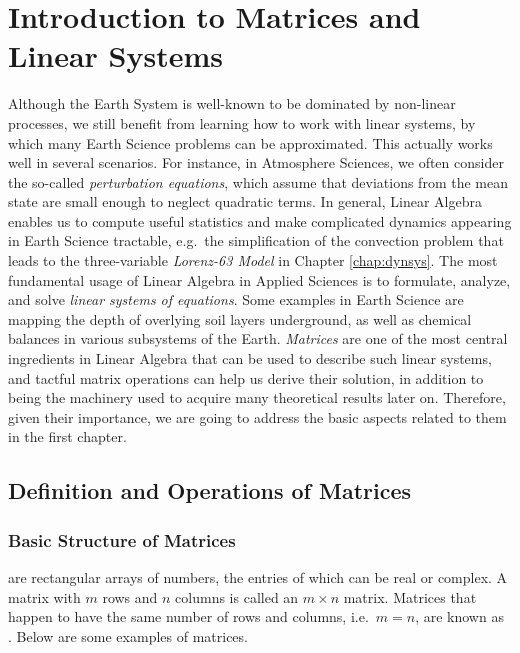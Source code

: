 \chapter{Introduction to Matrices and Linear Systems}

Although the Earth System is well-known to be dominated by non-linear processes, we still benefit from learning how to work with linear systems, by which many Earth Science problems can be approximated. This actually works well in several scenarios. For instance, in Atmosphere Sciences, we often consider the so-called \textit{perturbation equations}, which assume that deviations from the mean state are small enough to neglect quadratic terms. In general, Linear Algebra enables us to compute useful statistics and make complicated dynamics appearing in Earth Science tractable, e.g.\ the simplification of the convection problem that leads to the three-variable \textit{Lorenz-63 Model} in Chapter \ref{chap:dynsys}. The most fundamental usage of Linear Algebra in Applied Sciences is to formulate, analyze, and solve \textit{linear systems of equations}. Some examples in Earth Science are mapping the depth of overlying soil layers underground, as well as chemical balances in various subsystems of the Earth. \textit{Matrices} are one of the most central ingredients in Linear Algebra that can be used to describe such linear systems, and tactful matrix operations can help us derive their solution, in addition to being the machinery used to acquire many theoretical results later on. Therefore, given their importance, we are going to address the basic aspects related to them in the first chapter.

\section{Definition and Operations of Matrices}
\label{section:matrixdefn}

\subsection{Basic Structure of Matrices}
 are rectangular arrays of numbers, the entries of which can be real or complex. A matrix with $m$ rows and $n$ columns is called an $m \times n$ matrix. Matrices that happen to have the same number of rows and columns, i.e.\ $m = n$, are known as . Below are some examples of matrices.

